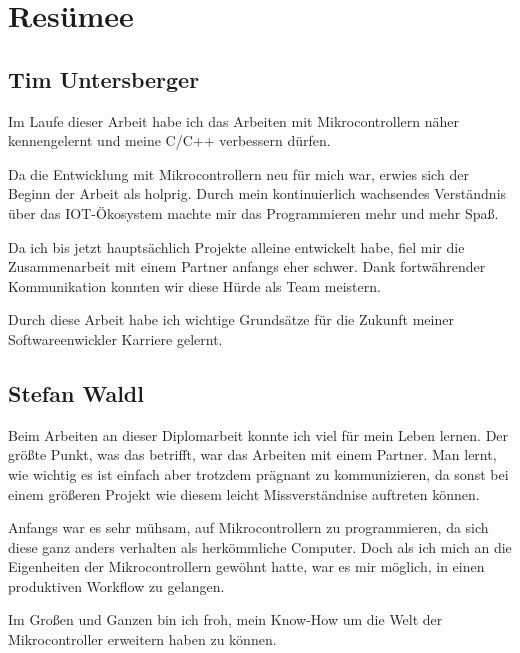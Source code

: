 \chapter{Resümee}

\section{Tim Untersberger}

Im Laufe dieser Arbeit habe ich das Arbeiten mit Mikrocontrollern näher kennengelernt und meine C/C++ verbessern dürfen.

Da die Entwicklung mit Mikrocontrollern neu für mich war, erwies sich der Beginn der Arbeit als holprig. Durch mein kontinuierlich wachsendes Verständnis über das IOT-Ökosystem machte mir das Programmieren mehr und mehr Spaß.

Da ich bis jetzt hauptsächlich Projekte alleine entwickelt habe, fiel mir die Zusammenarbeit mit einem Partner anfangs eher schwer. Dank fortwährender Kommunikation konnten wir diese Hürde als Team meistern.

Durch diese Arbeit habe ich wichtige Grundsätze für die Zukunft meiner Softwareenwickler Karriere gelernt.

\section{Stefan Waldl}
Beim Arbeiten an dieser Diplomarbeit konnte ich viel für mein Leben lernen. Der größte Punkt, was das betrifft, war das Arbeiten mit einem Partner. Man lernt, wie wichtig es ist einfach aber trotzdem prägnant zu kommunizieren, da sonst bei einem größeren Projekt wie diesem leicht Missverständnise auftreten können.

Anfangs war es sehr mühsam, auf Mikrocontrollern zu programmieren, da sich diese ganz anders verhalten als herkömmliche Computer. Doch als ich mich an die Eigenheiten der Mikrocontrollern gewöhnt hatte, war es mir möglich, in einen produktiven Workflow zu gelangen.

Im Großen und Ganzen bin ich froh, mein Know-How um die Welt der Mikrocontroller erweitern haben zu können.